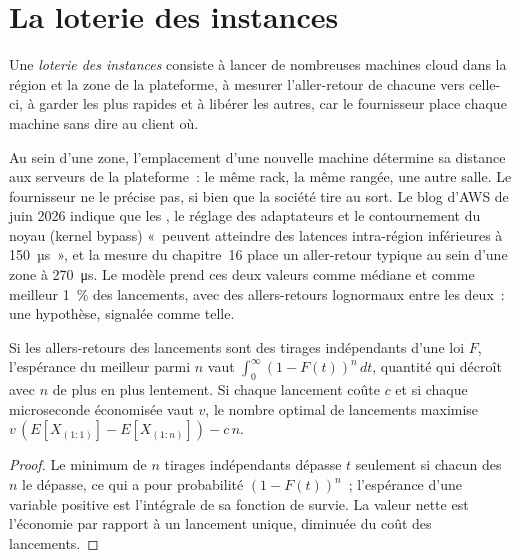 \section{La loterie des instances}

\begin{definition}\label{def:nw:where-the-crypto-venues-live:lottery}
Une \emph{loterie des instances} consiste à lancer de nombreuses machines cloud dans la région et la zone de la plateforme, à mesurer
l'aller-retour de chacune vers celle-ci, à garder les plus rapides et à libérer les autres, car le fournisseur place chaque machine sans dire au
client où.
\end{definition}

Au sein d'une zone, l'emplacement d'une nouvelle machine détermine sa distance aux serveurs de la plateforme~: le même rack, la même rangée, une autre salle. Le
fournisseur ne le précise pas, si bien que la société tire au sort. Le blog d'AWS de juin 2026 indique que les , le réglage des adaptateurs et le contournement du noyau (kernel bypass) «~peuvent atteindre
des latences intra-région inférieures à 150~µs~», et la mesure du chapitre~16 place un aller-retour typique au sein d'une zone à \qty{270}{\micro\second}. Le modèle
prend ces deux valeurs comme médiane et comme meilleur 1~\% des lancements, avec des allers-retours lognormaux entre les deux~: une hypothèse, signalée comme telle.

\begin{proposition}\label{prop:nw:where-the-crypto-venues-live:bestn}
Si les allers-retours des lancements sont des tirages indépendants d'une loi $F$, l'espérance du meilleur parmi $n$ vaut $\int_0^\infty (1 - F(t))^n\,dt$, quantité qui
décroît avec $n$ de plus en plus lentement. Si chaque lancement coûte $c$ et si chaque microseconde économisée vaut $v$, le nombre optimal de lancements maximise
$v\,(E[X_{(1:1)}] - E[X_{(1:n)}]) - c\,n$.
\end{proposition}

\begin{proof}
Le minimum de $n$ tirages indépendants dépasse $t$ seulement si chacun des $n$ le dépasse, ce qui a pour probabilité $(1-F(t))^n$~; l'espérance d'une variable positive
est l'intégrale de sa fonction de survie. La valeur nette est l'économie par rapport à un lancement unique, diminuée du coût des lancements.
\end{proof}

